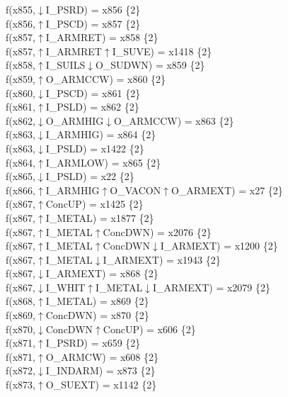 f(x855,$\downarrow$I\_PSRD) = x856 \{2\} \\  
f(x856,$\uparrow$I\_PSCD) = x857 \{2\} \\  
f(x857,$\uparrow$I\_ARMRET) = x858 \{2\} \\  
f(x857,$\uparrow$I\_ARMRET$\uparrow$I\_SUVE) = x1418 \{2\} \\  
f(x858,$\uparrow$I\_SUILS$\downarrow$O\_SUDWN) = x859 \{2\} \\  
f(x859,$\uparrow$O\_ARMCCW) = x860 \{2\} \\  
f(x860,$\downarrow$I\_PSCD) = x861 \{2\} \\  
f(x861,$\uparrow$I\_PSLD) = x862 \{2\} \\  
f(x862,$\downarrow$O\_ARMHIG$\downarrow$O\_ARMCCW) = x863 \{2\} \\  
f(x863,$\downarrow$I\_ARMHIG) = x864 \{2\} \\  
f(x863,$\downarrow$I\_PSLD) = x1422 \{2\} \\  
f(x864,$\uparrow$I\_ARMLOW) = x865 \{2\} \\  
f(x865,$\downarrow$I\_PSLD) = x22 \{2\} \\  
f(x866,$\uparrow$I\_ARMHIG$\uparrow$O\_VACON$\uparrow$O\_ARMEXT) = x27 \{2\} \\  
f(x867,$\uparrow$ConcUP) = x1425 \{2\} \\  
f(x867,$\uparrow$I\_METAL) = x1877 \{2\} \\  
f(x867,$\uparrow$I\_METAL$\uparrow$ConcDWN) = x2076 \{2\} \\  
f(x867,$\uparrow$I\_METAL$\uparrow$ConcDWN$\downarrow$I\_ARMEXT) = x1200 \{2\} \\  
f(x867,$\uparrow$I\_METAL$\downarrow$I\_ARMEXT) = x1943 \{2\} \\  
f(x867,$\downarrow$I\_ARMEXT) = x868 \{2\} \\  
f(x867,$\downarrow$I\_WHIT$\uparrow$I\_METAL$\downarrow$I\_ARMEXT) = x2079 \{2\} \\  
f(x868,$\uparrow$I\_METAL) = x869 \{2\} \\  
f(x869,$\uparrow$ConcDWN) = x870 \{2\} \\  
f(x870,$\downarrow$ConcDWN$\uparrow$ConcUP) = x606 \{2\} \\  
f(x871,$\uparrow$I\_PSRD) = x659 \{2\} \\  
f(x871,$\uparrow$O\_ARMCW) = x608 \{2\} \\  
f(x872,$\downarrow$I\_INDARM) = x873 \{2\} \\  
f(x873,$\uparrow$O\_SUEXT) = x1142 \{2\} \\  
